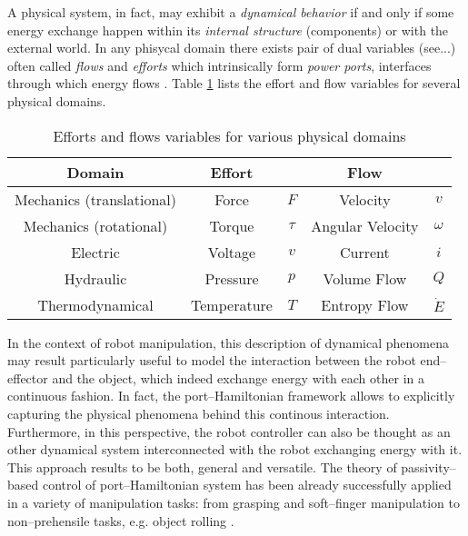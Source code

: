 %
A physical system, in fact, may exhibit a \textit{dynamical behavior} if and only if some energy exchange happen within its \textit{internal structure} (components) or with the external world. In any phisycal domain there exists pair of dual variables (see...) often called \textit{flows} and \textit{efforts} which intrinsically form \textit{power ports}, interfaces through which energy flows \cite{secchi2007control}. Table \ref{tab:ef} lists the effort and flow variables for several physical domains.
%
\begin{table}[b]
	\centering
	\begin{tabular}{|c|cc|cc|} \hline
			\rowcolor{gray!50}\textbf{Domain}&{\centering \textbf{Effort}}&&{\centering \textbf{Flow}}&\\\hline
			Mechanics (translational)&Force&$F$&Velocity&$v$\\\hline
			\rowcolor{gray!15}Mechanics (rotational)&Torque &$\tau$&Angular Velocity &$\omega$\\\hline
			Electric&Voltage &$v$&Current &$i$\\\hline
			\rowcolor{gray!15}Hydraulic&Pressure& $p$&Volume Flow &$Q$\\\hline
			Thermodynamical&Temperature &$T$&Entropy Flow &$\dot{E}$\\\hline
	\end{tabular}
	\caption{Efforts and flows variables for various physical domains}
	\label{tab:ef}
\end{table}
%
\newline

In the context of robot manipulation, this description of dynamical phenomena may result particularly useful to model the interaction between the robot end--effector and the object, which indeed exchange energy with each other in a continuous fashion.
%
In fact, the port--Hamiltonian framework allows to explicitly capturing the physical phenomena behind this continous interaction. Furthermore, in this perspective, the robot controller can also be thought as an other dynamical system interconnected with the robot exchanging energy with it. 
This approach results to be both, general and versatile.
%
The theory of passivity--based control of port--Hamiltonian system has been already successfully applied in a variety of manipulation tasks: from grasping \cite{stramigioli99} and soft--finger manipulation \cite{ficuciello2010} to non--prehensile tasks, e.g. object rolling \cite{donaire2017,serra2019}.
%
\newline

